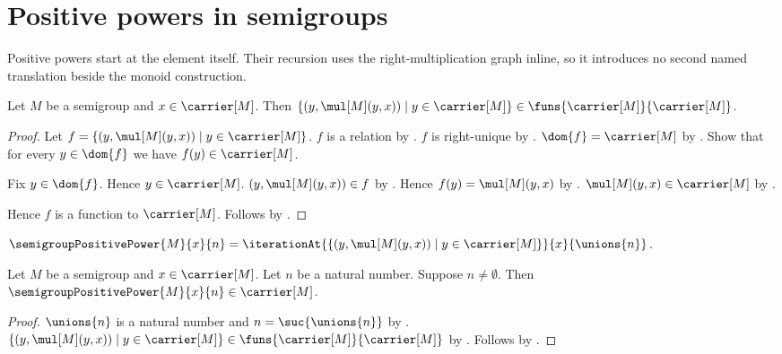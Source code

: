 



\section{Positive powers in semigroups}

Positive powers start at the element itself.  Their recursion uses the
right-multiplication graph inline, so it introduces no second named
translation beside the monoid construction.

\begin{theorem}\label{semigroup_positive_power_step_type}
    Let $M$ be a semigroup and $x\in\carrier[M]$.
    Then
        $\{(y,\mul[M](y,x))\mid y\in\carrier[M]\}
            \in\funs{\carrier[M]}{\carrier[M]}$.
\end{theorem}
\begin{proof}
    Let $f=\{(y,\mul[M](y,x))\mid y\in\carrier[M]\}$.
    $f$ is a relation by .
    $f$ is right-unique by .
    $\dom{f}=\carrier[M]$ by .
    Show that for every $y\in\dom{f}$ we have $f(y)\in\carrier[M]$.
    \begin{subproof}
        Fix $y\in\dom{f}$.
        Hence $y\in\carrier[M]$.
        $(y,\mul[M](y,x))\in f$ by .
        Hence $f(y)=\mul[M](y,x)$ by .
        $\mul[M](y,x)\in\carrier[M]$ by .
    \end{subproof}
    Hence $f$ is a function to $\carrier[M]$.
    Follows by .
\end{proof}

\begin{definition}\label{semigroup_positive_power}
    $\semigroupPositivePower{M}{x}{n}
        =\iterationAt{
            \{(y,\mul[M](y,x))\mid y\in\carrier[M]\}}
            {x}{\unions{n}}$.
\end{definition}

\begin{proposition}\label{semigroup_positive_power_type}
    Let $M$ be a semigroup and $x\in\carrier[M]$.
    Let $n$ be a natural number.
    Suppose $n\neq\emptyset$.
    Then $\semigroupPositivePower{M}{x}{n}\in\carrier[M]$.
\end{proposition}
\begin{proof}
    $\unions{n}$ is a natural number and
        $n=\suc{\unions{n}}$ by
        .
    $\{(y,\mul[M](y,x))\mid y\in\carrier[M]\}
        \in\funs{\carrier[M]}{\carrier[M]}$ by
        .
    Follows by
        .
\end{proof}

